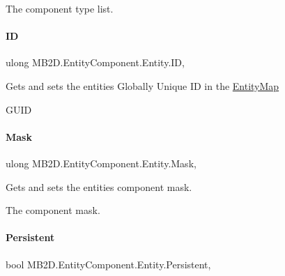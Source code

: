The component type list.\hypertarget{class_m_b2_d_1_1_entity_component_1_1_entity_a915dff6f7cff6dbf93377df68fab7c0e}{}\label{class_m_b2_d_1_1_entity_component_1_1_entity_a915dff6f7cff6dbf93377df68fab7c0e} 
\paragraph{\texorpdfstring{ID}{ID}}
{\footnotesize\ttfamily ulong M\+B2\+D.\+Entity\+Component.\+Entity.\+ID\hspace{0.3cm}{\ttfamily [get]}, {\ttfamily [set]}}



Gets and sets the entities Globally Unique ID in the \hyperlink{class_m_b2_d_1_1_entity_component_1_1_entity_map}{Entity\+Map} 

G\+U\+ID\hypertarget{class_m_b2_d_1_1_entity_component_1_1_entity_ada6cfb14adbc299a3b5616f833e4eb46}{}\label{class_m_b2_d_1_1_entity_component_1_1_entity_ada6cfb14adbc299a3b5616f833e4eb46} 
\paragraph{\texorpdfstring{Mask}{Mask}}
{\footnotesize\ttfamily ulong M\+B2\+D.\+Entity\+Component.\+Entity.\+Mask\hspace{0.3cm}{\ttfamily [get]}, {\ttfamily [set]}}



Gets and sets the entities component mask. 

The component mask.\hypertarget{class_m_b2_d_1_1_entity_component_1_1_entity_af72e02dfa9b3b5a24e7c97eb6ce2fd3a}{}\label{class_m_b2_d_1_1_entity_component_1_1_entity_af72e02dfa9b3b5a24e7c97eb6ce2fd3a} 
\paragraph{\texorpdfstring{Persistent}{Persistent}}
{\footnotesize\ttfamily bool M\+B2\+D.\+Entity\+Component.\+Entity.\+Persistent\hspace{0.3cm}{\ttfamily [get]}, {\ttfamily [set]}}



